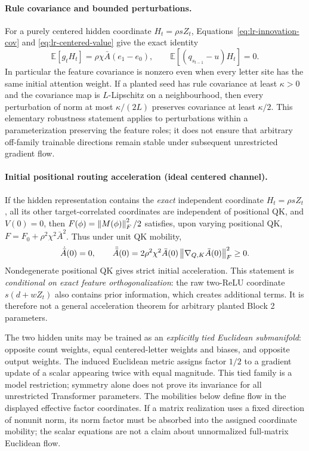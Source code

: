 \paragraph{Rule covariance and bounded perturbations.}
For a purely centered hidden coordinate $H_t=\rho sZ_t$,
Equations~\eqref{eq:lr-innovation-cov} and
\eqref{eq:lr-centered-value} give the exact identity
\begin{equation}\label{eq:lr-centered-seed-cov}
 \mathbb E[g_tH_t]=\rho\chi\bar A(e_1-e_0),\qquad
 \mathbb E[(q_{s_{t-1}}-u)H_t]=0.
\end{equation}
In particular the feature covariance is nonzero even when every
letter site has the same initial attention weight.  If a planted seed
has rule covariance at least $\kappa>0$ and the covariance map is
$L$-Lipschitz on a neighbourhood, then every perturbation of norm at
most $\kappa/(2L)$ preserves covariance at least $\kappa/2$.
This elementary robustness statement applies to perturbations within
a parameterization preserving the feature roles; it does not ensure
that arbitrary off-family trainable directions remain stable under
subsequent unrestricted gradient flow.

\paragraph{Initial positional routing acceleration (ideal centered channel).}
If the hidden representation contains the \emph{exact} independent
coordinate $H_t=\rho sZ_t$, all its other target-correlated coordinates
are independent of positional QK, and $V(0)=0$, then
$F(\phi)=\left\lVert M(\phi)\right\rVert_F^2/2$ satisfies, upon varying positional QK,
$F=F_0+\rho^2\chi^2\bar A^2$.  Thus under unit QK mobility,
\begin{equation}\label{eq:lr-centered-accel}
 \dot{\bar A}(0)=0,\qquad
 \ddot{\bar A}(0)=2\rho^2\chi^2\bar A(0)
 \left\lVert \nabla_{Q,K}\bar A(0)\right\rVert_F^2\ge0.
\end{equation}
Nondegenerate positional QK gives strict initial acceleration.
This statement is \emph{conditional on exact feature orthogonalization}:
the raw two-ReLU coordinate
$s(d+wZ_t)$ also contains prior information, which creates additional
terms.  It is therefore not a general acceleration theorem for arbitrary
planted Block 2 parameters.

The two hidden units may be trained as an \emph{explicitly tied Euclidean
submanifold}: opposite count weights, equal centered-letter weights and
biases, and opposite output weights.  The induced Euclidean metric assigns
factor $1/2$ to a gradient update of a scalar appearing twice with equal
magnitude.  This tied family is a model restriction; symmetry alone does
not prove its invariance for all unrestricted Transformer parameters.
The mobilities below define flow in the displayed effective factor coordinates.
If a matrix realization uses a fixed direction of nonunit norm, its norm
factor must be absorbed into the assigned coordinate mobility; the scalar
equations are not a claim about unnormalized full-matrix Euclidean flow.

